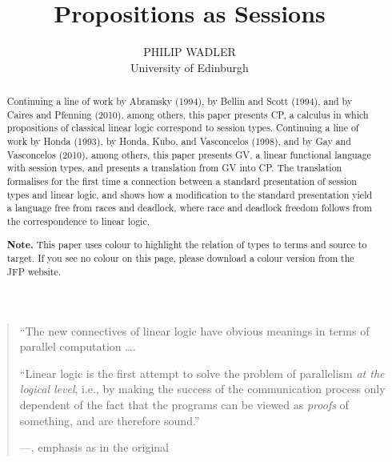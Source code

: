 \documentclass{jfp1}
\newenvironment{note}{\begin{trivlist} \item \textbf{Note. }}{\end{trivlist}}
\begin{document}

\title[Propositions as Sessions]
  {Propositions as Sessions}
\author[Philip Wadler]
  {PHILIP WADLER\\
   University of Edinburgh\\
   }

\maketitle


\begin{abstract}

  Continuing a line of work by Abramsky (1994), by Bellin and Scott
  (1994), and by Caires and Pfenning (2010), among others, this paper
  presents CP, a calculus in which propositions of classical linear
  logic correspond to session types.  Continuing a line of work by
  Honda (1993), by Honda, Kubo, and Vasconcelos (1998), and by Gay and
  Vasconcelos (2010), among others, this paper presents GV, a linear
  functional language with session types, and presents a translation
  from GV into CP.  The translation formalises for the first time a
  connection between a standard presentation of session types and
  linear logic, and shows how a modification to the standard
  presentation yield a language free from races and deadlock,
  where race and deadlock freedom follows from the correspondence
  to linear logic.

  \begin{note}
    This paper uses colour to highlight the relation of types to terms
    and source to target.  If you see no colour on this page, please
    download a colour version from the JFP website.
  \end{note}
\end{abstract}




\begin{quote}
  ``The new connectives of linear logic have obvious meanings in terms
  of parallel computation \ldots.

  ``Linear logic is the first attempt to
  solve the problem of parallelism \emph{at the logical level}, i.e., by
  making the success of the communication process only dependent of
  the fact that the programs can be viewed as \emph{proofs} of
  something, and are therefore sound.''

  ---\citet{Girard87}, emphasis as in the original
\end{quote}
\end{document}
